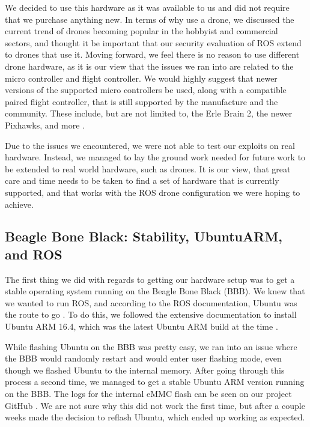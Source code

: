 \documentclass[IEEEtran,letterpaper,10pt,notitlepage,draftclsnofoot]{article}
\begin{document}
We decided to use this hardware as it was available to us and did not require that we purchase anything new.
In terms of why use a drone, we discussed the current trend of drones becoming popular in the hobbyist and
commercial sectors, and thought it be important that our security evaluation of ROS extend to drones that use it. Moving forward, we feel there is no reason to use different drone hardware, as it is our view that the
issues we ran into are related to the micro controller and flight controller. We would highly suggest that
newer versions of the supported micro controllers be used, along with a compatible paired flight controller,
that is still supported by the manufacture and the community. These include, but are not limited to, the
Erle Brain 2, the newer Pixhawks, and more \cite{ArduFlightController}.

Due to the issues we encountered, we were not able to test our exploits on real hardware. Instead, we managed
to lay the ground work needed for future work to be extended to real world hardware, such as drones. It is
our view, that great care and time needs to be taken to find a set of hardware that is currently supported,
and that works with the ROS drone configuration we were hoping to achieve.

\subsection{Beagle Bone Black: Stability, UbuntuARM, and ROS}

The first thing we did with regards to getting our hardware setup was to get a stable operating system
running on the Beagle Bone Black (BBB). We knew that we wanted to run ROS, and according to the ROS
documentation, Ubuntu was the route to go \cite{ROSBBBUbuntu}. To do this, we followed
the extensive documentation to install Ubuntu ARM 16.4, which was the latest Ubuntu ARM build at the time
\cite{eLinuxBBB}.

While flashing Ubuntu on the BBB was pretty easy, we ran into an issue where the BBB would randomly restart
and would enter user flashing mode, even though we flashed Ubuntu to the internal memory. After going through
this process a second time, we managed to get a stable Ubuntu ARM version running on the BBB. The logs for
the internal eMMC flash can be seen on our project GitHub \cite{eMMCLog}. We are not
sure why this did not work the first time, but after a couple weeks made the decision to reflash Ubuntu,
which ended up working as expected.
\end{document}
